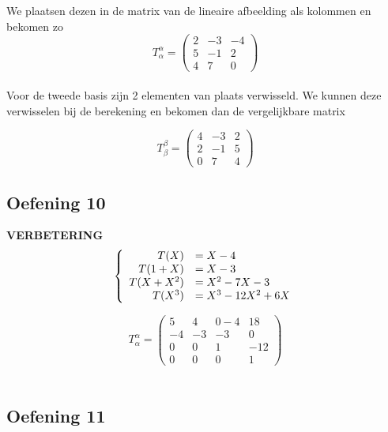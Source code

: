 \documentclass[lineaire_algebra_oplossingen.tex]{subfiles}
\begin{document}
We plaatsen dezen in de matrix van de lineaire afbeelding als kolommen en bekomen zo\\

\[
T^{\alpha}_{\alpha} =
\begin{pmatrix}
2 & -3 & -4\\
5 & -1 & 2\\
4 & 7 & 0
\end{pmatrix}
\]\\

Voor de tweede basis zijn 2 elementen van plaats verwisseld. We kunnen deze verwisselen bij de berekening en bekomen dan de vergelijkbare matrix

\[
T^{\beta}_{\beta} =
\begin{pmatrix}
4 & -3 & 2\\
2 & -1 & 5\\
0 & 7 & 4
\end{pmatrix}
\]


\subsection{Oefening 10}
\textbf{VERBETERING}
\[
\left\lbrace
\begin{array}{r l}
T(X) &= X-4\\
T(1+X) &= X-3\\
T(X+X^2) &= X^2-7X-3\\
T(X^3) &= X^3-12X^2+6X\\
\end{array}
\right.
\]

\[
T^{\alpha}_{\alpha} =
\begin{pmatrix}
5 & 4 & 0-4 & 18\\
-4 & -3 & -3 & 0\\
0 & 0 & 1 & -12\\
0 & 0 & 0 & 1
\end{pmatrix}
\]\\

\subsection{Oefening 11}
\end{document}
